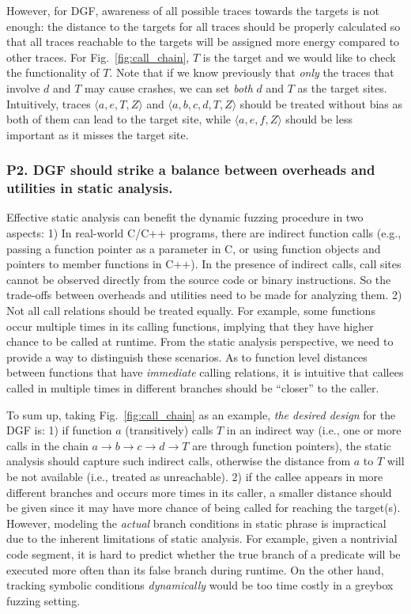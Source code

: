 However, for DGF, awareness of all possible traces towards the targets is not enough: the distance to the targets for all traces should be properly calculated so that all traces reachable to the targets will be assigned more energy compared to other traces. For Fig.~\ref{fig:call_chain}, $T$ is the target and we would like to check the functionality of $T$. Note that if we know previously that \emph{only} the traces that involve $d$ and $T$ may cause crashes, we can set \emph{both} $d$ and $T$ as the target sites. Intuitively, traces $ \langle a, e, T, Z\rangle$ and $\langle a, b, c, d, T, Z\rangle$ should be treated without bias as both of them can lead to the target site, while $ \langle a, e, f , Z\rangle$ should be less important as it misses the target site. 



\subsubsection{\textbf{P2}. DGF should strike a \textbf{balance} between overheads and utilities in static analysis.}\label{subsec:p2}  Effective static analysis can benefit the dynamic fuzzing procedure in two aspects: 1) In real-world C/C++ programs, there are indirect function calls (e.g., passing a function pointer as a parameter in C, or using function objects and pointers to member functions in C++). In the presence of indirect calls, call sites cannot be observed directly from the source code or binary instructions. So the trade-offs between overheads and utilities need to be made for analyzing them. 2) Not all call relations should be treated equally. For example, some functions occur multiple times in its calling functions, implying  that they have higher chance to be called at runtime. From the static analysis perspective, we need to provide a way to distinguish these scenarios. As to function level distances between functions that have \emph{immediate} calling relations, it is intuitive that callees called in multiple times in different branches should be ``closer'' to the caller.


To sum up, taking Fig.~\ref{fig:call_chain} as an example, \emph{the desired design} for the DGF is: 1) if function $a$ (transitively) calls $T$ in an indirect way (i.e., one or more calls in the chain $a\rightarrow\! b\!\rightarrow\! c\!\rightarrow\! d\!\rightarrow\! T$ are through function pointers), the static analysis should capture such indirect calls, otherwise the distance from $a$ to $T$ will be not available (i.e., treated as unreachable). 2) if the callee appears in more different branches and occurs more times in its caller, a smaller distance should be given since it may have more chance of being called for reaching the target(s). However, modeling the \emph{actual} branch conditions in static phrase is impractical due to the inherent limitations of static analysis. For example, given a nontrivial code segment, it is hard to predict whether the true branch of a predicate will be executed more often than its false branch during runtime. On the other hand, tracking symbolic conditions \emph{dynamically} would be too time costly in a greybox fuzzing setting.

